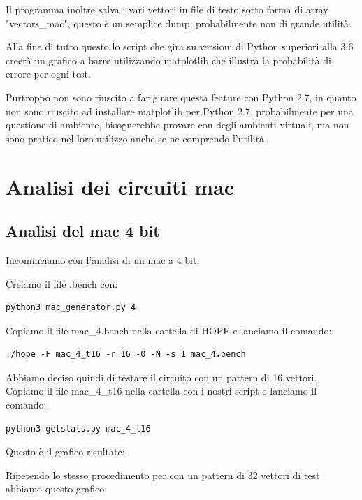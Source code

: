 \documentclass[12pt, letterpaper]{article}
\begin{document}
Il programma inoltre salva i vari vettori in file di testo sotto forma di array "vectors\_mac", questo è un semplice dump, probabilmente non di grande utilità.

Alla fine di tutto questo lo script che gira su versioni di Python superiori alla 3.6 creerà un grafico a barre utilizzando matplotlib che illustra la probabilità di errore per ogni test.

Purtroppo non sono riuscito a far girare questa feature con Python 2.7, in quanto non sono riuscito ad installare matplotlib per Python 2.7, probabilmente per una questione di ambiente, bisognerebbe provare con degli ambienti virtuali, ma non sono pratico nel loro utilizzo anche se ne comprendo l'utilità.

\section{Analisi dei circuiti mac}

\subsection{Analisi del mac 4 bit}

Incominciamo con l'analisi di un mac a 4 bit.

Creiamo il file .bench con:
\begin{lstlisting}
python3 mac_generator.py 4
\end{lstlisting}
Copiamo il file mac\_4.bench nella cartella di HOPE e lanciamo il comando:
\begin{lstlisting}
./hope -F mac_4_t16 -r 16 -0 -N -s 1 mac_4.bench
\end{lstlisting}
Abbiamo deciso quindi di testare il circuito con un pattern di 16 vettori.
Copiamo il file mac\_4\_t16 nella cartella con i nostri script e lanciamo il comando:
\begin{lstlisting}
python3 getstats.py mac_4_t16
\end{lstlisting}
Questo è il grafico risultate:
\begin{figure}
\centering

\end{figure}

Ripetendo lo stesso procedimento per con un pattern di 32 vettori di test abbiamo questo grafico:

\begin{figure}
\centering

\end{figure}
\end{document}
